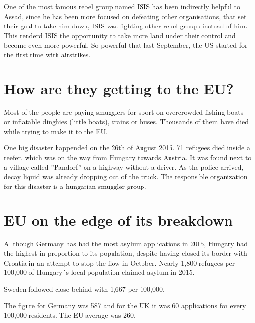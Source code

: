 One of the most famous rebel group named ISIS has been indirectly helpful to Assad, since he has been more focused on defeating other organisations, that set their goal to take him down, ISIS was fighting other rebel groups instead of him.
This renderd ISIS the opportunity to take more land under their control and become even more powerful. So powerful that last September, the US started for the first time with airstrikes.

\section{How are they getting to the EU?}
Most of the people are paying smugglers for sport on overcrowded fishing boats or inflatable dinghies (little boats), trains or buses. Thousands of them have died while trying to make it to the EU.

One big disaster happended on the 26th of August 2015. 71 refugees died inside a reefer, which was on the way from Hungary towards Austria. It was found next to a village called ''Pandorf'' on a highway without a driver. As the police arrived, decay liquid was already dropping out of the truck. The responsible organization for this disaster is a hungarian smuggler group.

\section{EU on the edge of its breakdown}
Allthough Germany has had the most asylum applications in 2015, Hungary had the highest in proportion to its population, despite having closed its border with Croatia in an attempt to stop the flow in October. Nearly 1,800 refugees per 100,000 of Hungary´s local population claimed asylum in 2015.

Sweden followed close behind with 1,667 per 100,000.

The figure for Germany was 587 and for the UK it was 60 applications for every 100,000 residents. The EU average was 260.

